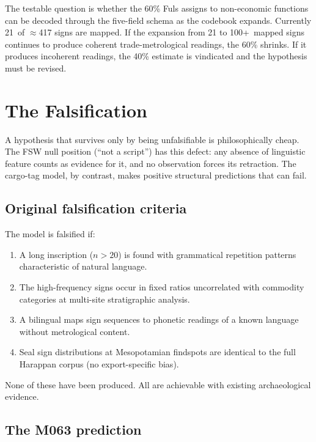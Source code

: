 The testable question is whether the 60\% Fuls assigns to
non-economic functions can be decoded through the five-field
schema as the codebook expands. Currently 21~of $\approx$417
signs are mapped. If the expansion from 21 to 100+~mapped signs
continues to produce coherent trade-metrological readings, the
60\% shrinks. If it produces incoherent readings, the 40\%
estimate is vindicated and the hypothesis must be revised.

\section{The Falsification}

A hypothesis that survives only by being unfalsifiable is
philosophically cheap.
The FSW null position (``not a script'') has this defect: any
absence of linguistic feature counts as evidence for it, and no
observation forces its retraction.
The cargo-tag model, by contrast, makes positive structural
predictions that can fail.

\subsection{Original falsification criteria}

The model is falsified if:

\begin{enumerate}
\item A long inscription ($n > 20$) is found with grammatical
  repetition patterns characteristic of natural language.
\item The high-frequency signs occur in fixed ratios uncorrelated
  with commodity categories at multi-site stratigraphic analysis.
\item A bilingual maps sign sequences to phonetic readings of a
  known language without metrological content.
\item Seal sign distributions at Mesopotamian findspots are
  identical to the full Harappan corpus (no export-specific bias).
\end{enumerate}

\noindent
None of these have been produced.
All are achievable with existing archaeological evidence.

\subsection{The M063 prediction}

